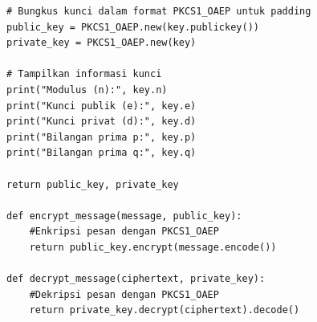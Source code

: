 \documentclass{article}
\begin{document}

\begin{verbatim}
# Bungkus kunci dalam format PKCS1_OAEP untuk padding
public_key = PKCS1_OAEP.new(key.publickey())
private_key = PKCS1_OAEP.new(key)

# Tampilkan informasi kunci
print("Modulus (n):", key.n)
print("Kunci publik (e):", key.e)
print("Kunci privat (d):", key.d)
print("Bilangan prima p:", key.p)
print("Bilangan prima q:", key.q)

return public_key, private_key

def encrypt_message(message, public_key):
    #Enkripsi pesan dengan PKCS1_OAEP
    return public_key.encrypt(message.encode())

def decrypt_message(ciphertext, private_key):
    #Dekripsi pesan dengan PKCS1_OAEP
    return private_key.decrypt(ciphertext).decode()
\end{verbatim}
\end{document}
